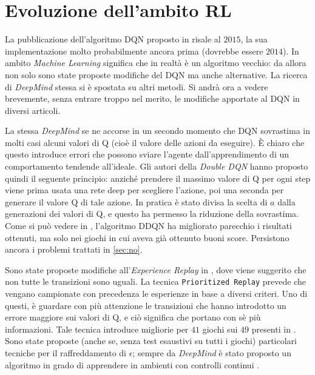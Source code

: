 \documentclass[twoside,twocolumn,10pt]{extarticle}
\theoremstyle{definition}
\begin{document}
		

\section{Evoluzione dell'ambito RL}\label{sec:evoalg}
	La pubblicazione dell'algoritmo DQN proposto in \cite{bib:dqn} risale al $2015$, la sua implementazione molto probabilmente ancora prima (dovrebbe essere $2014$). In ambito \textit{Machine Learning} significa che in realtà è un algoritmo vecchio: da allora non solo sono state proposte modifiche del DQN ma anche alternative. La ricerca di \textit{DeepMind} stessa si è spostata su altri metodi.	Si andrà ora a vedere brevemente, senza entrare troppo nel merito, le modifiche apportate al DQN in diversi articoli.
	
	La stessa \textit{DeepMind} se ne accorse in un secondo momento che DQN sovrastima in molti casi alcuni valori di Q (cioè il valore delle azioni da eseguire). È chiaro che questo introduce errori che possono sviare l'agente dall'apprendimento di un comportamento tendende all'ideale. Gli autori della \textit{Double DQN} \cite{bib:ddqn} hanno proposto quindi il seguente principio: anziché prendere il massimo valore di Q per ogni step viene prima usata una rete deep per scegliere l'azione, poi una seconda per generare il valore Q di tale azione. In pratica è stato divisa la scelta di $a$ dalla generazioni dei valori di Q, e questo ha permesso la riduzione della sovrastima. Come si può vedere in \cite{bib:ddqn}, l'algoritmo DDQN ha migliorato parecchio i risultati ottenuti, ma solo nei giochi in cui aveva già ottenuto buoni score. Persistono ancora i problemi trattati in \ref{sec:no}. 
	
	Sono state proposte modifiche all'\textit{Experience Replay} in \cite{bib:per}, dove viene suggerito che non tutte le transizioni sono uguali. La tecnica \texttt{Prioritized Replay} prevede che vengano campionate con precedenza le esperienze in base a diversi criteri. Uno di questi, è guardare con più attenzione le transizioni che hanno introdotto un errore maggiore sui valori di Q, e ciò significa che portano con sè più informazioni. Tale tecnica introduce migliorie per $41$ giochi sui $49$ presenti in \cite{bib:dqn}. Sono state proposte (anche se, senza test esaustivi su tutti i giochi) particolari tecniche per il raffreddamento di $\epsilon$; sempre da \textit{DeepMind} è stato proposto un algoritmo in grado di apprendere in ambienti con controlli continui \cite{bib:con}.
\end{document}
